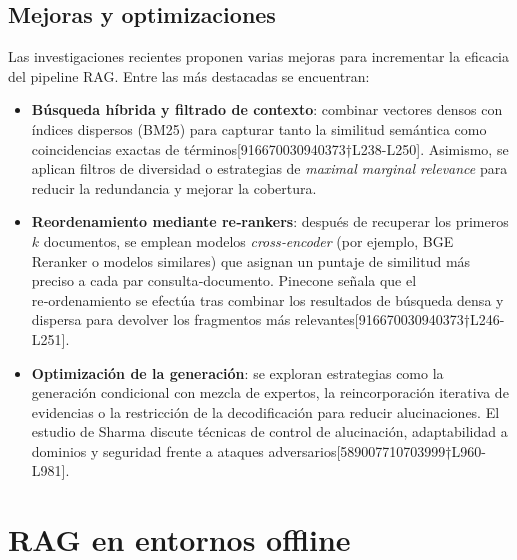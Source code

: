 \subsection{Mejoras y optimizaciones}

Las investigaciones recientes proponen varias mejoras para incrementar la eficacia del pipeline RAG.  Entre las más destacadas se encuentran:

\begin{itemize}
  \item \textbf{Búsqueda híbrida y filtrado de contexto}: combinar vectores densos con índices dispersos (BM25) para capturar tanto la similitud semántica como coincidencias exactas de términos[916670030940373†L238-L250].  Asimismo, se aplican filtros de diversidad o estrategias de \textit{maximal marginal relevance} para reducir la redundancia y mejorar la cobertura.
  \item \textbf{Reordenamiento mediante re‑rankers}: después de recuperar los primeros $k$ documentos, se emplean modelos \textit{cross‑encoder} (por ejemplo, BGE Reranker o modelos similares) que asignan un puntaje de similitud más preciso a cada par consulta‑documento.  Pinecone señala que el re‑ordenamiento se efectúa tras combinar los resultados de búsqueda densa y dispersa para devolver los fragmentos más relevantes[916670030940373†L246-L251].
  \item \textbf{Optimización de la generación}: se exploran estrategias como la generación condicional con mezcla de expertos, la reincorporación iterativa de evidencias o la restricción de la decodificación para reducir alucinaciones.  El estudio de Sharma \cite{sharma2025survey} discute técnicas de control de alucinación, adaptabilidad a dominios y seguridad frente a ataques adversarios[589007710703999†L960-L981].
\end{itemize}

\section{RAG en entornos offline}

